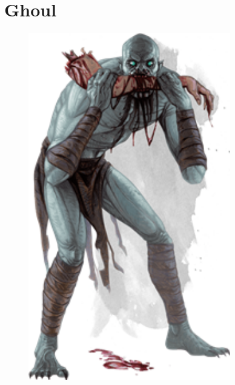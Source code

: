 \documentclass[oneside]{clgrammar}
\begin{document}
\newpage

\section{Ghoul}
\begin{figure}[h!]
\centering
\includegraphics[width=250pt]{images/monstros/ghoul.png}
\end{figure}

\newpage
\end{document}
